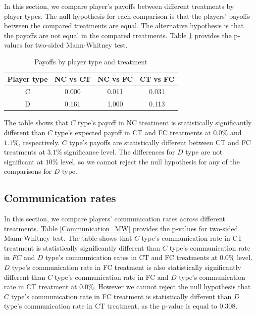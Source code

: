 \documentclass[12pt]{article}
\theoremstyle{break}
\begin{document}
In this section, we compare player's payoffs between different treatments by player types. The null hypothesis for each comparison is that the players' payoffs between the compared treatments are equal. The alternative hypothesis is that the payoffs are not equal in the compared treatments. Table \ref{Payoffs_MW} provides the p-values for two-sided Mann-Whitney test.

\begin{table}[h!]
\begin{center}
	\begin{tabular}{c | c c c}
			Player type & NC vs CT & NC vs FC & CT vs FC \\
			\hline
			C & 0.000 	& 0.011	& 0.031\\
			D & 0.161	& 1.000 & 0.113\\ 
	\end{tabular}
	\end{center}
	\caption{Payoffs by player type and treatment}\label{Payoffs_MW}	
\end{table}

The table shows that $C$ type's payoff in NC treatment is statistically significantly different than $C$ type's expected payoff in CT and FC treatments at $0.0\%$ and $1.1\%$, respectively. $C$ type's payoffs are statistically different between CT and FC treatments at $3.1\%$ significance level. The differences for $D$ type are not significant at $10\%$ level, so we cannot reject the null hypothesis for any of the comparisons for $D$ type.

\subsection{Communication rates}
In this section, we compare players' communication rates across different treatments. Table \ref{Communication_MW} provides the p-values for two-sided Mann-Whitney test. The table shows that $C$ type's communication rate in CT treatment is statistically significantly different than $C$ type's communication rate in $FC$ and $D$ type's communication rates in CT and FC treatments at $0.0\%$ level. $D$ type's communication rate in FC treatment is also statistically significantly different than $C$ type's communication rate in FC and $D$ type's communication rate in CT treatment at $0.0\%$. However we cannot reject the null hypothesis that $C$ type's communication rate in FC treatment is statistically different than $D$ type's communication rate in CT treatment, as the p-value is equal to $0.308$.
\end{document}
